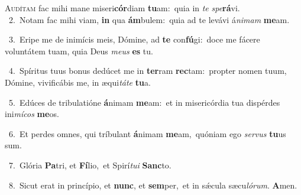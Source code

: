 \lettrine{\initial\textcolor{\initialcolor}{A}}{udítam} fac mihi mane miseri\-\textbf{cór}\-diam \textbf{tu}\-am:~\star quia in \textit{te} \textit{spe}\-\textbf{rá}vi.\\
{\numbfont\textcolor{\numbcolor}{~2.}}~Notam fac mihi viam, \textbf{in} qua \textbf{ám}\-bulem:~\star quia ad te levávi á\-\textit{ni}\-\textit{mam} \textbf{me}\-am.\par
{\numbfont\textcolor{\numbcolor}{~3.}}~Eripe me de inimícis meis, Dómine, ad \textbf{te} con\-\textbf{fú}\-gi:~\star doce me fácere voluntátem tuam, quia Deus \textit{me}\-\textit{us} \textbf{es} tu.\par
{\numbfont\textcolor{\numbcolor}{~4.}}~Spíritus tuus bonus dedúcet me in \textbf{ter}\-ram \textbf{rec}\-tam:~\star propter nomen tuum, Dómine, vivificábis me, in æqui\-\textit{tá}\-\textit{te} \textbf{tu}\-a.\par
{\numbfont\textcolor{\numbcolor}{~5.}}~Edúces de tribulatióne \textbf{á}\-nimam \textbf{me}\-am:~\star et in misericórdia tua dispérdes ini\-\textit{mí}\-\textit{cos} \textbf{me}\-os.\par
{\numbfont\textcolor{\numbcolor}{~6.}}~Et perdes omnes, qui tríbulant \textbf{á}\-nimam \textbf{me}\-am,~\star quóniam ego \textit{ser}\-\textit{vus} \textbf{tu}\-us sum.\par
{\numbfont\textcolor{\numbcolor}{~7.}}~Glória \textbf{Pa}\-tri, et \textbf{Fí}\-lio,~\star et Spirí\-\textit{tu}\-\textit{i} \textbf{Sanc}\-to.\par
{\numbfont\textcolor{\numbcolor}{~8.}}~Sicut erat in princípio, et \textbf{nunc}\-, et \textbf{sem}\-per,~\star et in sǽcula sæcu\-\textit{ló}\-\textit{rum}. \textbf{A}\-men.\par
